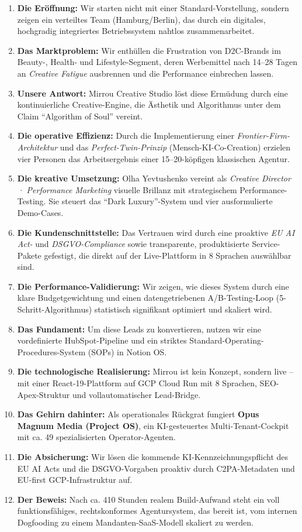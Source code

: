 \documentclass[11pt,a4paper]{article}
\begin{document}
\begin{enumerate}[label=\textbf{\arabic*.}]
    \item \textbf{Die Eröffnung:} Wir starten nicht mit einer Standard-Vorstellung, sondern zeigen ein verteiltes Team (Hamburg/Berlin), das durch ein digitales, hochgradig integriertes Betriebssystem nahtlos zusammenarbeitet.
    \item \textbf{Das Marktproblem:} Wir enthüllen die Frustration von D2C-Brands im Beauty-, Health- und Lifestyle-Segment, deren Werbemittel nach 14--28 Tagen an \textit{Creative Fatigue} ausbrennen und die Performance einbrechen lassen.
    \item \textbf{Unsere Antwort:} Mirrou Creative Studio löst diese Ermüdung durch eine kontinuierliche Creative-Engine, die Ästhetik und Algorithmus unter dem Claim ``Algorithm of Soul'' vereint.
    \item \textbf{Die operative Effizienz:} Durch die Implementierung einer \textit{Frontier-Firm-Architektur} und das \textit{Perfect-Twin-Prinzip} (Mensch-KI-Co-Creation) erzielen vier Personen das Arbeitsergebnis einer 15--20-köpfigen klassischen Agentur.
    \item \textbf{Die kreative Umsetzung:} Olha Yevtushenko vereint als \textit{Creative Director · Performance Marketing} visuelle Brillanz mit strategischem Performance-Testing. Sie steuert das ``Dark Luxury''-System und vier ausformulierte Demo-Cases.
    \item \textbf{Die Kundenschnittstelle:} Das Vertrauen wird durch eine proaktive \textit{EU AI Act-} und \textit{DSGVO-Compliance} sowie transparente, produktisierte Service-Pakete gefestigt, die direkt auf der Live-Plattform in 8 Sprachen auswählbar sind.
    \item \textbf{Die Performance-Validierung:} Wir zeigen, wie dieses System durch eine klare Budgetgewichtung und einen datengetriebenen A/B-Testing-Loop (5-Schritt-Algorithmus) statistisch signifikant optimiert und skaliert wird.
    \item \textbf{Das Fundament:} Um diese Leads zu konvertieren, nutzen wir eine vordefinierte HubSpot-Pipeline und ein striktes Standard-Operating-Procedures-System (SOPs) in Notion OS.
    \item \textbf{Die technologische Realisierung:} Mirrou ist kein Konzept, sondern live -- mit einer React-19-Plattform auf GCP Cloud Run mit 8 Sprachen, SEO-Apex-Struktur und vollautomatischer Lead-Bridge.
    \item \textbf{Das Gehirn dahinter:} Als operationales Rückgrat fungiert \textbf{Opus Magnum Media (Project OS)}, ein KI-gesteuertes Multi-Tenant-Cockpit mit ca. 49 spezialisierten Operator-Agenten.
    \item \textbf{Die Absicherung:} Wir lösen die kommende KI-Kennzeichnungspflicht des EU AI Acts und die DSGVO-Vorgaben proaktiv durch C2PA-Metadaten und EU-first GCP-Infrastruktur auf.
    \item \textbf{Der Beweis:} Nach ca. 410 Stunden realem Build-Aufwand steht ein voll funktionsfähiges, rechtskonformes Agentursystem, das bereit ist, vom internen Dogfooding zu einem Mandanten-SaaS-Modell skaliert zu werden.
\end{enumerate}
\end{document}
